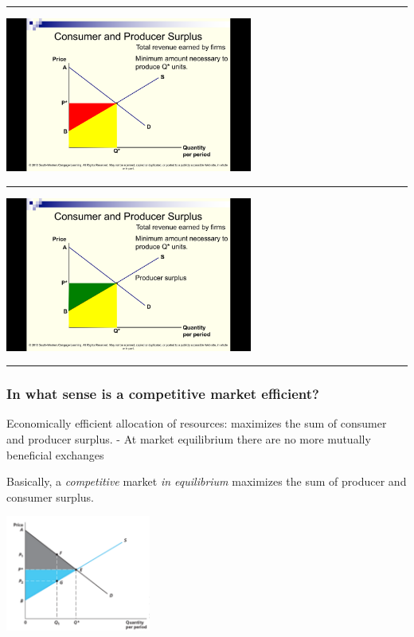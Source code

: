 \documentclass[]{article}
\begin{document}
\begin{center}\rule{0.5\linewidth}{\linethickness}\end{center}

\includegraphics[height=2in]{picsfigs/prodsurp2.png}

\begin{center}\rule{0.5\linewidth}{\linethickness}\end{center}

\includegraphics[height=2in]{picsfigs/prodsurp3.png}

\begin{center}\rule{0.5\linewidth}{\linethickness}\end{center}

\hypertarget{in-what-sense-is-a-competitive-market-efficient}{%
\subsubsection{In what sense is a competitive market
efficient?}\label{in-what-sense-is-a-competitive-market-efficient}}

Economically efficient allocation of resources: maximizes the sum of
consumer and producer surplus. - At market equilibrium there are no more
mutually beneficial exchanges

\bigskip

Basically, a \emph{competitive} market \emph{in equilibrium} maximizes
the sum of producer and consumer surplus.

\includegraphics[height=1.5in]{picsfigs/consumerprodrsurplusmax.png}
\end{document}
